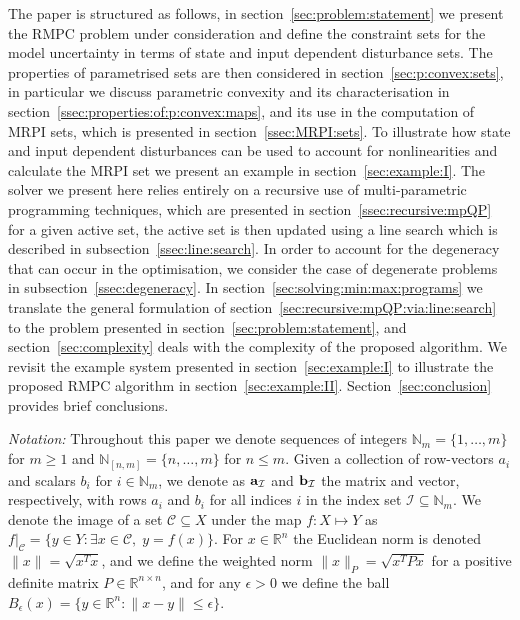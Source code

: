 \documentclass[journal]{IEEEtran}
\theoremstyle{remark}
\theoremstyle{definition}
\begin{document}
The paper is structured as follows, in section~\ref{sec:problem:statement} we present the RMPC problem under consideration
and define the constraint sets for the model uncertainty in terms of state and input dependent disturbance sets.
%
The properties of parametrised sets are then considered in section~\ref{sec:p:convex:sets}, in particular we discuss
parametric convexity and its characterisation in section~\ref{ssec:properties:of:p:convex:maps}, and its use in the computation of MRPI sets, which is presented in section~\ref{ssec:MRPI:sets}.
%
To illustrate how state and input dependent disturbances can be used to account for nonlinearities and 
calculate the MRPI set we present an example in section~\ref{sec:example:I}.
%
The solver we present here relies entirely on a recursive use of multi-parametric programming techniques, 
which are presented in section~\ref{ssec:recursive:mpQP} for a given active set, the active set is then
updated using a line search which is described in subsection~\ref{ssec:line:search}. In order to account for the 
degeneracy that can occur in the optimisation, we consider the case of degenerate problems in subsection~\ref{ssec:degeneracy}.
%
In section~\ref{sec:solving:min:max:programs} we translate the general formulation of section~\ref{sec:recursive:mpQP:via:line:search}
to the problem presented in section~\ref{sec:problem:statement}, and section~\ref{sec:complexity}
deals with the complexity of the proposed algorithm.
%
We revisit the example system presented in section~\ref{sec:example:I} to illustrate the proposed RMPC
algorithm in section~\ref{sec:example:II}.
%
Section~\ref{sec:conclusion} provides brief conclusions.

\emph{Notation:} Throughout this paper 
%
we denote sequences of integers $\mathbb N_m = \{1,\ldots,m\}$ for $m\geq 1$ and $\mathbb N_{[n,m]} = \{n,\ldots,m\}$ for $n\leq m$.
%
Given a collection of row-vectors $a_i$ and scalars $b_i$ for $i\in\mathbb N_m$, we denote as ${\bf{a}}_{\mathcal I}$ and ${\bf{b}}_{\mathcal I}$ the matrix and vector, respectively, with rows $a_i$ and $b_i$ for all indices $i$ in the index set $\mathcal I\subseteq \mathbb N_m$.
%
We denote 
the image of a set $\mathcal C\subseteq X$ under the map $f:X\mapsto Y$ as $f\vert_{\mathcal C} = \{y\in Y:\exists x\in\mathcal C,\;y=f(x)\}$. 
%
For $x\in\mathbb R^n$ the Euclidean norm is denoted $\|x\|=\sqrt{x^T x}$, and we define the weighted norm $\|x\|_P=\sqrt{x^T P x}$ for a positive definite matrix $P\in\mathbb R^{n\times n}$, and for any $\epsilon > 0$ we define the ball $B_\epsilon(x) = \{y\in\mathbb R^n : \|x-y\| \leq \epsilon\}$.
\end{document}
